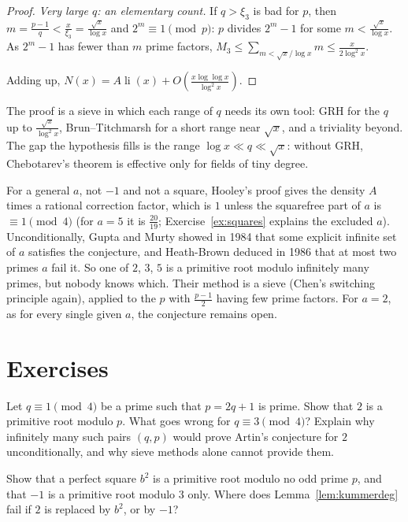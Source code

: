 \begin{proof}
\emph{Very large $q$: an elementary count.} If $q>\xi_3$ is bad for $p$, then $m=\frac{p-1}q<\frac x{\xi_3}=\frac{\sqrt x}{\log x}$ and $2^m\equiv1\pmod p$: $p$ divides $2^m-1$ for some $m<\frac{\sqrt x}{\log x}$. As $2^m-1$ has fewer than $m$ prime factors, $M_3\le\sum_{m<\sqrt x/\log x}m\le\frac x{2\log^2x}$.

Adding up, $N(x)=A\operatorname{li}(x)+O(\frac{x\log\log x}{\log^2x})$.
\end{proof}

The proof is a sieve in which each range of $q$ needs its own tool: GRH for the $q$ up to $\frac{\sqrt x}{\log^2x}$, Brun--Titchmarsh for a short range near $\sqrt x$, and a triviality beyond. The gap the hypothesis fills is the range $\log x\ll q\ll\sqrt x$: without GRH, Chebotarev's theorem is effective only for fields of tiny degree.

\begin{remark}
For a general $a$, not $-1$ and not a square, Hooley's proof gives the density $A$ times a rational correction factor, which is $1$ unless the squarefree part of $a$ is $\equiv1\pmod4$ (for $a=5$ it is $\frac{20}{19}$; Exercise~\ref{ex:squares} explains the excluded $a$). Unconditionally, Gupta and Murty showed in 1984 that some explicit infinite set of $a$ satisfies the conjecture, and Heath-Brown deduced in 1986 that at most two primes $a$ fail it. So one of $2$, $3$, $5$ is a primitive root modulo infinitely many primes, but nobody knows which. Their method is a sieve (Chen's switching principle again), applied to the $p$ with $\frac{p-1}2$ having few prime factors. For $a=2$, as for every single given $a$, the conjecture remains open.
\end{remark}

\section{Exercises}

\begin{exercise}[$\star$]\label{ex:sg}
Let $q\equiv1\pmod4$ be a prime such that $p=2q+1$ is prime. Show that $2$ is a primitive root modulo $p$. What goes wrong for $q\equiv3\pmod4$? Explain why infinitely many such pairs $(q,p)$ would prove Artin's conjecture for $2$ unconditionally, and why sieve methods alone cannot provide them.
\end{exercise}

\begin{exercise}[$\star$]\label{ex:squares}
Show that a perfect square $b^2$ is a primitive root modulo no odd prime $p$, and that $-1$ is a primitive root modulo $3$ only. Where does Lemma~\ref{lem:kummerdeg} fail if $2$ is replaced by $b^2$, or by $-1$?
\end{exercise}

